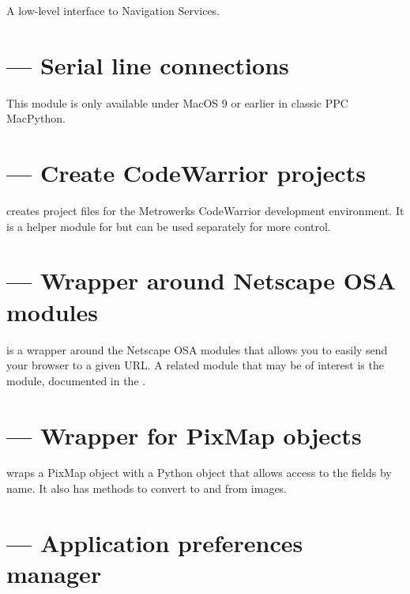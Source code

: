 A low-level interface to Navigation Services. 


\section{ --- Serial line connections}

This module is only available under MacOS 9 or earlier in classic PPC MacPython.

\section{ --- Create CodeWarrior projects}

 creates project files for the Metrowerks CodeWarrior
development environment. It is a helper module for
 but can be used separately for more
control.


\section{ --- Wrapper around Netscape OSA modules}

 is a wrapper around the Netscape OSA modules that
allows you to easily send your browser to a given URL.  A related
module that may be of interest is the  module,
documented in the .


\section{ --- Wrapper for PixMap objects}

 wraps a PixMap object with a Python object that
allows access to the fields by name. It also has methods to convert
to and from  images.


\section{ --- Application preferences manager}

